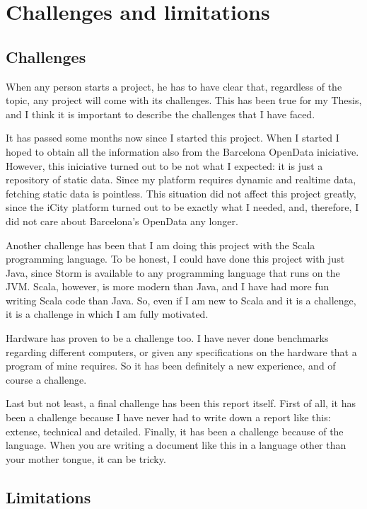 
\section{Challenges and limitations}

\subsection{Challenges}

When any person starts a project, he has to have clear that, regardless of the
topic, any project will come with its challenges. This has been true for my
Thesis, and I think it is important to describe the challenges that I have
faced.

It has passed some months now since I started this project. When I started I
hoped to obtain all the information also from the Barcelona OpenData
iniciative. However, this iniciative turned out to be not what I expected: it
is just a repository of static data. Since my platform requires dynamic and
realtime data, fetching static data is pointless. This situation did not
affect this project greatly, since the iCity platform turned out to be exactly
what I needed, and, therefore, I did not care about Barcelona's OpenData any
longer.

Another challenge has been that I am doing this project with the Scala
programming language. To be honest, I could have done this project with just
Java, since Storm is available to any programming language that runs on the
JVM. Scala, however, is more modern than Java, and I have had more fun writing
Scala code than Java. So, even if I am new to Scala and it is a challenge,
it is a challenge in which I am fully motivated.

Hardware has proven to be a challenge too. I have never done benchmarks
regarding different computers, or given any specifications on the hardware that
a program of mine requires. So it has been definitely a new experience, and of
course a challenge.

Last but not least, a final challenge has been this report itself. First of
all, it has been a challenge because I have never had to write down a report
like this: extense, technical and detailed. Finally, it has been a challenge
because of the language. When you are writing a document like this in a
language other than your mother tongue, it can be tricky.

\subsection{Limitations}

